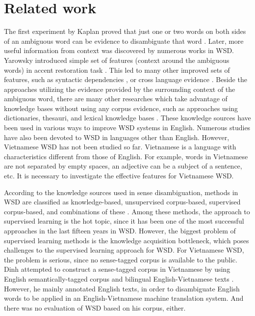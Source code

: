 \documentclass[english]{jnlp_1.4}
\begin{document}
\section{Related work} \label{section:relatedwork}
The first experiment by Kaplan proved that just one or two words on both sides of an ambiguous word can be evidence to disambiguate that word \cite{Kaplan1950}.
Later, more useful information from context was discovered by numerous works in WSD. 
Yarowsky introduced simple set of features (context around the ambiguous words) in accent restoration task \cite{Yarowsky1994}. 
This led to many other improved sets of features, 
    such as syntactic dependencies \cite{martinez:02:a,Dang2002,Yarowsky2002},
or cross language evidence \cite{GaleChurch1992}. 
Beside the approaches utilizing the evidence provided by the surrounding context of the ambiguous word, 
there are many other researches which take advantage of knowledge bases without using any corpus evidence,
such as approaches using dictionaries, thesauri, and lexical knowledge bases \cite{Lesk1986,Agirre2001}.
These knowledge sources have been used in various ways to improve WSD systems in English. 
Numerous studies have also been devoted to WSD in languages other than English.
However, Vietnamese WSD has not been studied so far.
Vietnamese is a language with characteristics different from those of English. 
For example, words in Vietnamese are not separated by empty spaces, an adjective can be a subject of a sentence, etc.
It is necessary to investigate the effective features for Vietnamese WSD.

According to the knowledge sources used in sense disambiguation, 
methods in WSD are classified as knowledge-based, unsupervised corpus-based, supervised corpus-based, 
and combinations of these \cite{WSDbook}. 
Among these methods, the approach to supervised learning is the hot topic,
since it has been one of the most successful approaches in the last fifteen years in WSD. 
However, the biggest problem of supervised learning methods is the knowledge acquisition bottleneck, 
which poses challenges to the supervised learning approach for WSD.
For Vietnamese WSD, the problem is serious, 
since no sense-tagged corpus is available to the public.
Dinh attempted to construct a sense-tagged corpus in Vietnamese by using English semantically-tagged corpus and bilingual English-Vietnamese texts \cite{Dinh2002}. 
However, he mainly annotated English texts, in order to disambiguate English words to be applied in an English-Vietnamese machine translation system. 
And there was no evaluation of WSD based on his corpus, either. 
\end{document}
